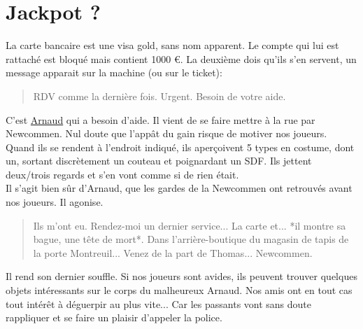 \documentclass[10pt,a4paper,twocolumn]{article}
\begin{document}
\section{Jackpot ?}
La carte bancaire est une visa gold, sans nom apparent. Le compte qui lui est rattaché est bloqué mais contient 1000 €. La deuxième dois qu'ils s'en servent, un message apparait sur la machine (ou sur le ticket): 
\begin{quote}
RDV comme la dernière fois. Urgent. Besoin de votre aide.
\end{quote}
C'est \hyperlink{arnaud}{Arnaud} qui a besoin d'aide. Il vient de se faire mettre à la rue par Newcommen. Nul doute que l'appât du gain risque de motiver nos joueurs. \\
Quand ils se rendent à l'endroit indiqué, ils aperçoivent 5 types en costume, dont un, sortant discrètement un couteau et poignardant un SDF. Ils jettent deux/trois regards et s'en vont comme si de rien était.
\\
Il s'agit bien sûr d'Arnaud, que les gardes de la Newcommen ont retrouvés avant nos joueurs. Il agonise.
\begin{quote}
Ils m'ont eu. Rendez-moi un dernier service... La carte et... *il montre sa bague, une tête de mort*. Dans l'arrière-boutique du magasin de tapis de la porte Montreuil... Venez de la part de Thomas... Newcommen.
\end{quote}
Il rend son dernier souffle.
Si nos joueurs sont avides, ils peuvent trouver quelques objets intéressants sur le corps du malheureux Arnaud.
Nos amis ont en tout cas tout intérêt à déguerpir au plus vite... Car les passants vont sans doute rappliquer et se faire un plaisir d'appeler la police.
\end{document}
